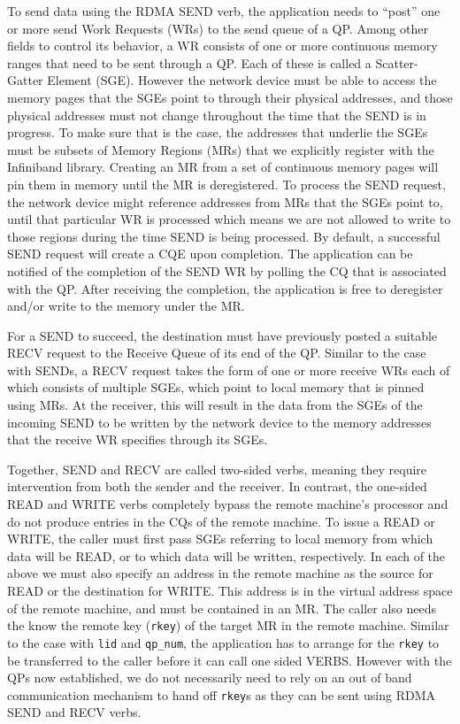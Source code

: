 To send data using the RDMA SEND verb, the application needs to ``post'' one
or more send Work Requests (WRs) to the send queue of a QP. Among other fields
to control its behavior, a WR consists of one or more
continuous memory ranges that need to be sent through a QP. Each of these
is called a Scatter-Gatter Element (SGE). However the network device must be
able to access the memory pages that the SGEs point to through their physical
addresses, and those physical addresses must not change throughout the time
that the SEND is in progress. To make sure that is the case, the addresses
that underlie the SGEs must be subsets of Memory Regions (MRs) that we
explicitly register with the Infiniband library. Creating an MR from a set of
continuous memory pages will pin them in memory until the MR is
deregistered. To process the SEND request, the network device might reference
addresses from MRs that the SGEs point to, until that particular WR is
processed which means we are not allowed to write to those regions during
the time SEND is being processed. By default, a successful SEND request will
create a CQE upon completion. The application can be notified of the completion
of the SEND WR by polling the CQ that is associated with the QP. After receiving
the completion, the application is free to deregister and/or write to the
memory under the MR.

For a SEND to succeed, the destination must have previously posted a suitable
RECV request to the Receive Queue of its end of the QP. Similar to the case with SENDs,
a RECV request takes the form of one or more receive WRs each of which
consists of multiple SGEs, which point to local memory that is pinned using
MRs. At the receiver, this will result in the data from the SGEs of the incoming
SEND to be written by the network device to the memory addresses that the
receive WR specifies through its SGEs.

Together, SEND and RECV are called two-sided verbs, meaning they require
intervention from both the sender and the receiver. In contrast, the one-sided
READ and WRITE verbs completely bypass the remote machine's processor and do not
produce entries in the CQs of the remote machine. To
issue a READ or WRITE, the caller must first pass SGEs referring to local memory
from which data will be READ, or to which data will be written, respectively.
In each of the above we must also specify an address in the remote machine
as the source for READ or the destination for WRITE. This address is in
the virtual address space of the remote machine, and must be contained in an
MR. The caller also needs the know the remote key (\texttt{rkey}) of the target
MR in the remote machine. Similar to the case with \texttt{lid} and
\texttt{qp\_num}, the application has to arrange for the \texttt{rkey} to be
transferred to the caller before it can call one sided VERBS. However with the
QPs now established, we do not necessarily need to rely on an out of band
communication mechanism to hand off \texttt{rkey}s as they can be sent using
RDMA SEND and RECV verbs.

